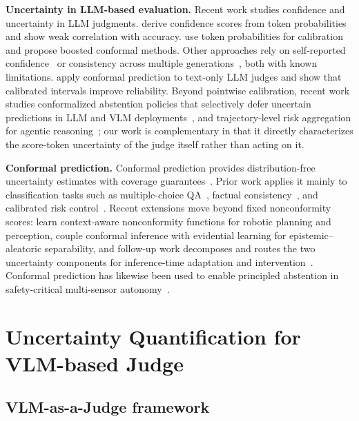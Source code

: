 \documentclass{article}
\begin{document}
\textbf{Uncertainty in LLM-based evaluation.}
Recent work studies confidence and uncertainty in LLM judgments. \citet{wagner2024llmconfidence} derive confidence scores from token probabilities and show weak correlation with accuracy. \citet{xie2024boosted} use token probabilities for calibration and propose boosted conformal methods. Other approaches rely on self-reported confidence~\citep{xiong2024selfconsistency} or consistency across multiple generations~\citep{tian2023consistency}, both with known limitations. \citet{sheng2025analyzing} apply conformal prediction to text-only LLM judges and show that calibrated intervals improve reliability. Beyond pointwise calibration, recent work studies conformalized abstention policies that selectively defer uncertain predictions in LLM and VLM deployments~\citep{tayebati2025conformalabstention,tayebati2025cap}, and trajectory-level risk aggregation for agentic reasoning~\citep{tayebati2026tracer}; our work is complementary in that it directly characterizes the score-token uncertainty of the judge itself rather than acting on it.

\textbf{Conformal prediction.}
Conformal prediction provides distribution-free uncertainty estimates with coverage guarantees~\citep{vovk2005algorithmic}. Prior work applies it mainly to classification tasks such as multiple-choice QA~\citep{kumar2023conformal,su2024api}, factual consistency~\citep{quach2024conformal,mohri2024language}, and calibrated risk control~\citep{angelopoulos2021conformal}. Recent extensions move beyond fixed nonconformity scores: \citet{kumar2025learnablecp} learn context-aware nonconformity functions for robotic planning and perception, \citet{stutts2024conformal} couple conformal inference with evidential learning for epistemic--aleatoric separability, and follow-up work decomposes and routes the two uncertainty components for inference-time adaptation and intervention~\citep{kumar2025calibrated,kumar2026triage}. Conformal prediction has likewise been used to enable principled abstention in safety-critical multi-sensor autonomy~\citep{kumar2025lidarcp}.

\section{Uncertainty Quantification for VLM-based Judge}
\label{sec:uncertainty}

\subsection{VLM-as-a-Judge framework}
\end{document}

